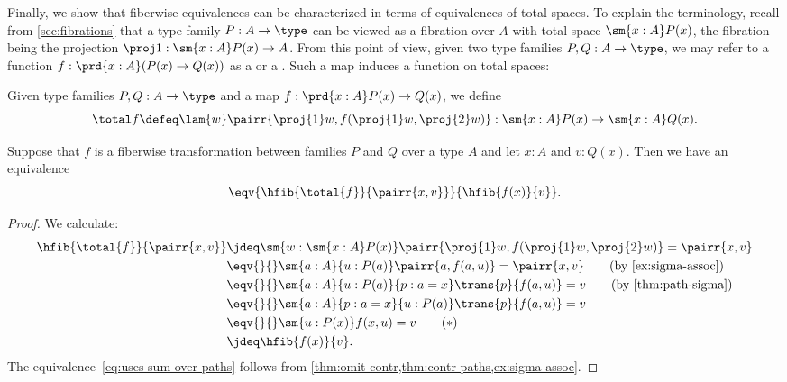 %

%
%
Finally, we show that fiberwise equivalences can be characterized in terms of equivalences of total spaces.
To explain the terminology, recall from \cref{sec:fibrations} that a type family $P:A\to\type$ can be viewed as a fibration over $A$ with total space $\sm{x:A} P(x)$, the fibration being the projection $\proj1:\sm{x:A} P(x) \to A$.
From this point of view, given two type families $P,Q:A\to\type$, we may refer to a function $f:\prd{x:A} (P(x)\to Q(x))$ as a  or a .
%
%
%
%
Such a map induces a function on total spaces:

\begin{defn}\label{defn:total-map}
  Given type families $P,Q:A\to\type$ and a map $f:\prd{x:A} P(x)\to Q(x)$, we define
  \begin{equation*}
    \total f  \defeq \lam{w}\pairr{\proj{1}w,f(\proj{1}w,\proj{2}w)} : \sm{x:A}P(x)\to\sm{x:A}Q(x).
  \end{equation*}
\end{defn}

\begin{thm}\label{fibwise-fiber-total-fiber-equiv}
Suppose that $f$ is a fiberwise transformation between families $P$ and
$Q$ over a type $A$ and let $x:A$ and $v:Q(x)$. Then we have an equivalence
\begin{equation*}
\eqv{\hfib{\total{f}}{\pairr{x,v}}}{\hfib{f(x)}{v}}.
\end{equation*}
\end{thm}
\begin{proof}
  We calculate:
\begin{align}
  \hfib{\total{f}}{\pairr{x,v}}
  & \jdeq \sm{w:\sm{x:A}P(x)}\pairr{\proj{1}w,f(\proj{1}w,\proj{2}w)}=\pairr{x,v}
  \notag \\
  & \eqv{}{} \sm{a:A}{u:P(a)}\pairr{a,f(a,u)}=\pairr{x,v}
  \tag{by~\cref{ex:sigma-assoc}} \\
  & \eqv{}{} \sm{a:A}{u:P(a)}{p:a=x}\trans{p}{f(a,u)}=v
  \tag{by \cref{thm:path-sigma}} \\
  & \eqv{}{} \sm{a:A}{p:a=x}{u:P(a)}\trans{p}{f(a,u)}=v
  \notag \\
  & \eqv{}{} \sm{u:P(x)}f(x,u)=v
  \tag{$*$}\label{eq:uses-sum-over-paths} \\
  & \jdeq \hfib{f(x)}{v}. \notag
\end{align}
The equivalence~\eqref{eq:uses-sum-over-paths} follows from \cref{thm:omit-contr,thm:contr-paths,ex:sigma-assoc}.
\end{proof}

